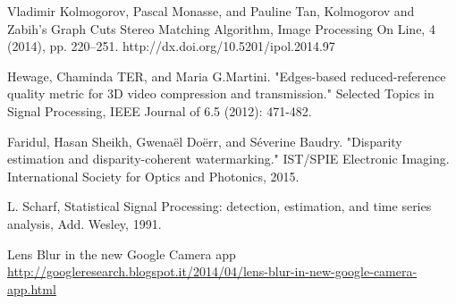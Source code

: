 
\begin{thebibliography}{99}



Vladimir Kolmogorov, Pascal Monasse, and Pauline Tan, Kolmogorov and Zabih’s Graph Cuts Stereo Matching Algorithm, Image Processing On Line, 4 (2014), pp. 220–251. http://dx.doi.org/10.5201/ipol.2014.97


 Hewage, Chaminda TER, and Maria G.Martini. "Edges-based reduced-reference quality metric for 3D video compression and transmission." Selected Topics in Signal Processing, IEEE Journal of 6.5 (2012): 471-482.

Faridul, Hasan Sheikh, Gwenaël Doërr, and Séverine Baudry. "Disparity estimation and disparity-coherent watermarking." IST/SPIE Electronic Imaging. International Society for Optics and Photonics, 2015.

L. Scharf, Statistical Signal Processing: detection,
estimation, and time series analysis, Add. Wesley,
1991.

 Lens Blur in the new Google Camera app \newline
\url{http://googleresearch.blogspot.it/2014/04/lens-blur-in-new-google-camera-app.html}






\end{thebibliography}
\clearpage
\thispagestyle{empty}